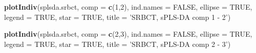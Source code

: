 \documentclass[]{book}
\newenvironment{Shaded}{\begin{snugshade}}{\end{snugshade}}
\newcommand{\KeywordTok}[1]{\textcolor[rgb]{0.13,0.29,0.53}{\textbf{#1}}}
\newcommand{\DataTypeTok}[1]{\textcolor[rgb]{0.13,0.29,0.53}{#1}}
\newcommand{\DecValTok}[1]{\textcolor[rgb]{0.00,0.00,0.81}{#1}}
\newcommand{\StringTok}[1]{\textcolor[rgb]{0.31,0.60,0.02}{#1}}
\newcommand{\OtherTok}[1]{\textcolor[rgb]{0.56,0.35,0.01}{#1}}
\newcommand{\NormalTok}[1]{#1}
\begin{document}
\begin{Shaded}
\begin{Highlighting}[]
\KeywordTok{plotIndiv}\NormalTok{(splsda.srbct, }\DataTypeTok{comp =} \KeywordTok{c}\NormalTok{(}\DecValTok{1}\NormalTok{,}\DecValTok{2}\NormalTok{),}
          \DataTypeTok{ind.names =} \OtherTok{FALSE}\NormalTok{,}
          \DataTypeTok{ellipse =} \OtherTok{TRUE}\NormalTok{, }\DataTypeTok{legend =} \OtherTok{TRUE}\NormalTok{,}
          \DataTypeTok{star =} \OtherTok{TRUE}\NormalTok{,}
          \DataTypeTok{title =} \StringTok{'SRBCT, sPLS-DA comp 1 - 2'}\NormalTok{)}
\end{Highlighting}
\end{Shaded}

\begin{Shaded}
\begin{Highlighting}[]
\KeywordTok{plotIndiv}\NormalTok{(splsda.srbct, }\DataTypeTok{comp =} \KeywordTok{c}\NormalTok{(}\DecValTok{2}\NormalTok{,}\DecValTok{3}\NormalTok{),}
          \DataTypeTok{ind.names =} \OtherTok{FALSE}\NormalTok{,}
          \DataTypeTok{ellipse =} \OtherTok{TRUE}\NormalTok{, }\DataTypeTok{legend =} \OtherTok{TRUE}\NormalTok{,}
          \DataTypeTok{star =} \OtherTok{TRUE}\NormalTok{,}
          \DataTypeTok{title =} \StringTok{'SRBCT, sPLS-DA comp 2 - 3'}\NormalTok{)}
\end{Highlighting}
\end{Shaded}
\end{document}
